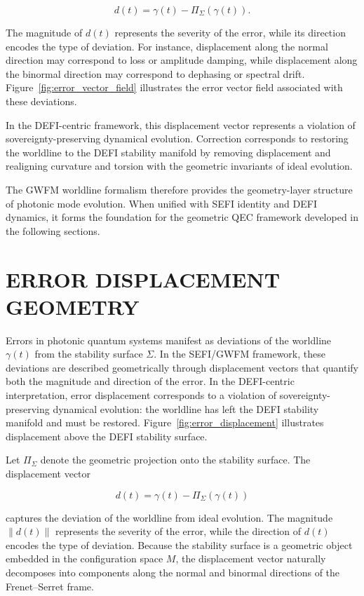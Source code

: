 \documentclass[aip,adv,reprint,floatfix]{revtex4-2}
\begin{document}
\[
d(t) = \gamma(t) - \Pi_{\Sigma}(\gamma(t)).
\]


The magnitude of $d(t)$ represents the severity of the error, while its direction encodes the type of deviation. For
instance, displacement along the normal direction may
correspond to loss or amplitude damping, while displacement along the binormal direction may correspond to
dephasing or spectral drift.\cite{DuttonElectronField2026} Figure~\ref{fig:error_vector_field}
illustrates the error vector field associated with these deviations.

In the DEFI-centric framework, this displacement vector represents a violation of sovereignty-preserving dynamical evolution.\cite{DuttonSEFI2026} Correction corresponds to restoring
the worldline to the DEFI stability manifold by removing
displacement and realigning curvature and torsion with
the geometric invariants of ideal evolution.

The GWFM worldline formalism therefore provides
the geometry-layer structure of photonic mode evolution.
When unified with SEFI identity and DEFI dynamics, it
forms the foundation for the geometric QEC framework
developed in the following sections.
\section{ERROR DISPLACEMENT GEOMETRY}

Errors in photonic quantum systems manifest as deviations of the worldline $\gamma(t)$ from the stability surface $\Sigma$.
In the SEFI/GWFM framework, these deviations are described geometrically through displacement vectors that
quantify both the magnitude and direction of the error.\cite{DuttonElectronField2026}
In the DEFI-centric interpretation, error displacement
corresponds to a violation of sovereignty-preserving dynamical evolution: the worldline has left the DEFI stability manifold and must be restored. Figure~\ref{fig:error_displacement}
illustrates displacement above the DEFI stability surface.

Let $\Pi_{\Sigma}$ denote the geometric projection onto the stability surface. The displacement vector


\[
d(t) = \gamma(t) - \Pi_{\Sigma}(\gamma(t))
\]


captures the deviation of the worldline from ideal evolution.\cite{DuttonElectronField2026} The magnitude $\|d(t)\|$ represents the severity of
the error, while the direction of $d(t)$ encodes the type
of deviation. Because the stability surface is a geometric object embedded in the configuration space $M$, the
displacement vector naturally decomposes into components along the normal and binormal directions of the
Frenet–Serret frame.
\end{document}
